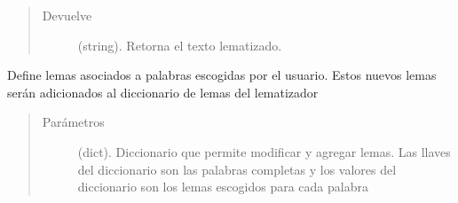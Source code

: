 \documentclass[letterpaper,10pt,openany,spanish]{sphinxmanual}
\begin{document}
\begin{fulllineitems}
\begin{fulllineitems}
\begin{quote}
\begin{description}
\item[{Devuelve}] \leavevmode
(string). Retorna el texto lematizado.

\end{description}\end{quote}

\end{fulllineitems}


\begin{fulllineitems}
\label{\detokenize{funciones/lematizacion:lematizacion.LematizadorSpacy.modificar_lemmas}}
Define lemas asociados a palabras escogidas por el usuario. Estos nuevos             lemas serán adicionados al diccionario de lemas del lematizador
\begin{quote}\begin{description}
\item[{Parámetros}] \leavevmode
{} \textendash{} (dict). Diccionario que permite modificar y agregar             lemas. Las llaves del diccionario son las palabras completas y los             valores del diccionario son los lemas escogidos para cada palabra

\end{description}\end{quote}

\end{fulllineitems}


\end{fulllineitems}

\end{document}
